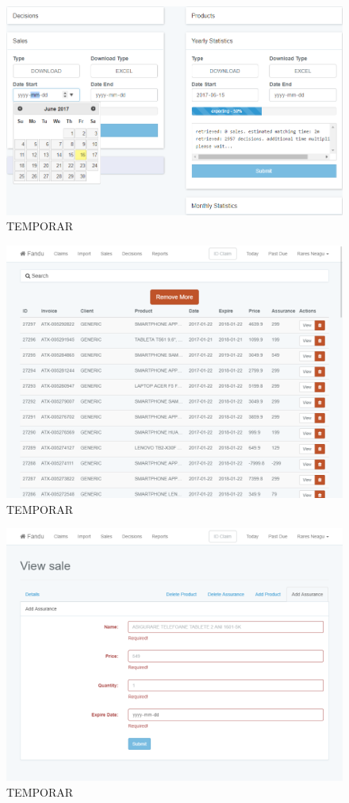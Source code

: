 	\begin{figure}
		\includegraphics[width=\linewidth]{../imagini/reports.png}
		\caption{TEMPORAR}
		\label{fig:TEMP}
	\end{figure}
	\begin{figure}
		\includegraphics[width=\linewidth]{../imagini/sales.png}
		\caption{TEMPORAR}
		\label{fig:TEMP}
	\end{figure}
	\begin{figure}
		\includegraphics[width=\linewidth]{../imagini/sales_add_assurance.png}
		\caption{TEMPORAR}
		\label{fig:TEMP}
	\end{figure}

